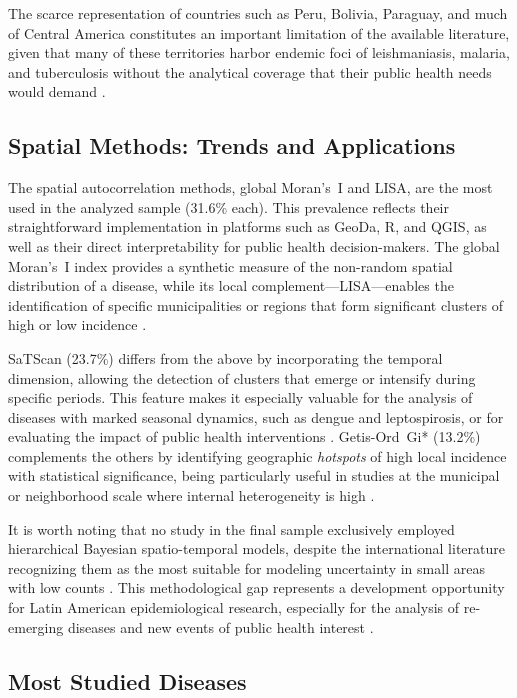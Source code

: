 \documentclass[runningheads]{llncs}
\begin{document}
The scarce representation of countries such as Peru, Bolivia,
Paraguay, and much of Central America constitutes an
important limitation of the available literature, given that
many of these territories harbor endemic foci of
leishmaniasis, malaria, and tuberculosis without the
analytical coverage that their public health needs would
demand \cite{Habereder2025}.

\subsection{Spatial Methods: Trends and Applications}

The spatial autocorrelation methods, global Moran's~I and
LISA, are the most used in the analyzed sample (31.6\% each).
This prevalence reflects their straightforward implementation
in platforms such as GeoDa, R, and QGIS, as well as their
direct interpretability for public health decision-makers.
The global Moran's~I index provides a synthetic measure of
the non-random spatial distribution of a disease, while its
local complement---LISA---enables the identification of
specific municipalities or regions that form significant
clusters of high or low incidence \cite{Lin2022}.

SaTScan (23.7\%) differs from the above by incorporating the
temporal dimension, allowing the detection of clusters that
emerge or intensify during specific periods. This feature
makes it especially valuable for the analysis of diseases
with marked seasonal dynamics, such as dengue and
leptospirosis, or for evaluating the impact of public health
interventions \cite{Souza2023,Bermudi2025}. Getis-Ord~Gi*
(13.2\%) complements the others by identifying geographic
\textit{hotspots} of high local incidence with statistical
significance, being particularly useful in studies at the
municipal or neighborhood scale where internal heterogeneity
is high \cite{Tavares2024}.

It is worth noting that no study in the final sample
exclusively employed hierarchical Bayesian spatio-temporal
models, despite the international literature recognizing them
as the most suitable for modeling uncertainty in small areas
with low counts \cite{Zhu2022,Chen2022}. This
methodological gap represents a development opportunity for
Latin American epidemiological research, especially for the
analysis of re-emerging diseases and new events of public
health interest \cite{NIRAULA2026100961}.

\subsection{Most Studied Diseases}
\end{document}
